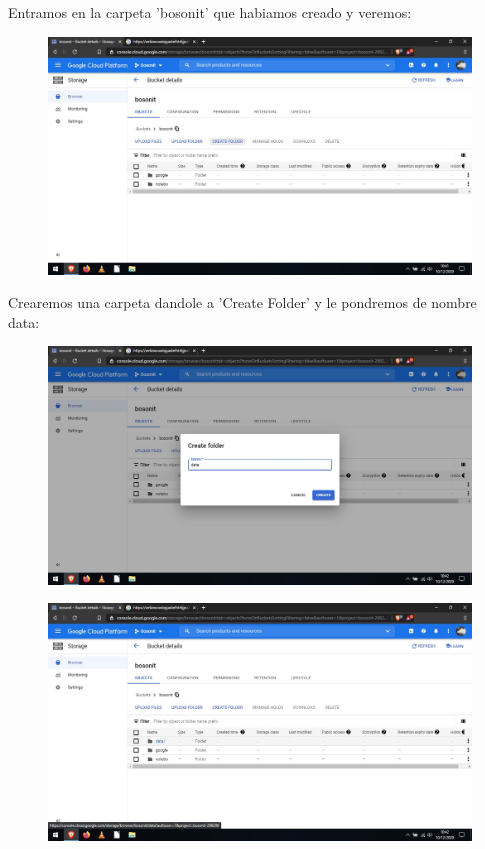 \documentclass[a4paper,10pt]{article}
\begin{document}
Entramos en la carpeta 'bosonit' que habiamos creado y veremos:

\begin{figure}[H]
\begin{center}
\includegraphics[width=500pt]{./fotos/GoogleCloud/41 - GC.jpg}
\end{center}
\end{figure}

Crearemos una carpeta dandole a 'Create Folder' y le pondremos de nombre data:

\begin{figure}[H]
\begin{center}
\includegraphics[width=500pt]{./fotos/GoogleCloud/43 - GC.jpg}
\end{center}
\end{figure}

\begin{figure}[H]
\begin{center}
\includegraphics[width=500pt]{./fotos/GoogleCloud/44 - GC.jpg}
\end{center}
\end{figure}
\end{document}
